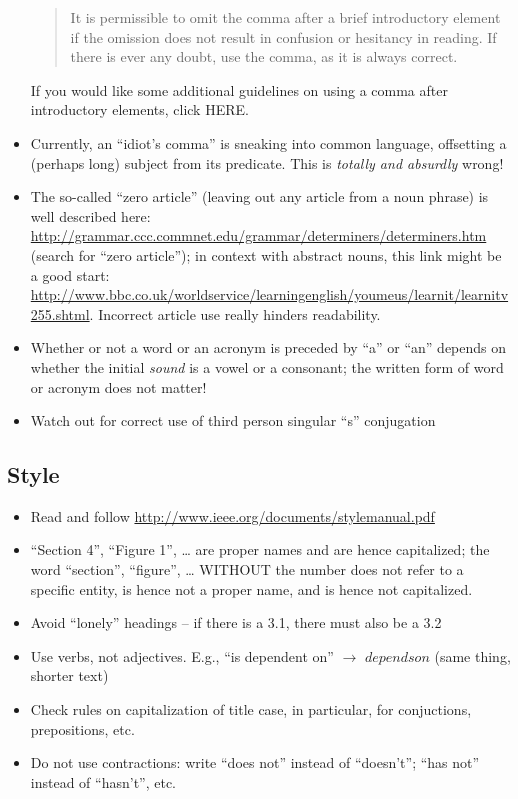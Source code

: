 \begin{itemize}
\begin{quote}
    It is permissible to omit the comma after a brief introductory
    element if the omission does not result in confusion or hesitancy
    in reading. If there is ever any doubt, use the comma, as it is
    always correct. 
  \end{quote}
 If you would like some additional guidelines on 
    using a comma after introductory elements, click HERE.
\item Currently, an ``idiot's comma'' is sneaking into common language, offsetting a (perhaps long) subject from its predicate. This is \emph{totally and absurdly} wrong! 
\item The so-called ``zero article'' (leaving out any article from a noun
phrase) is well described here:
\url{http://grammar.ccc.commnet.edu/grammar/determiners/determiners.htm}
(search for ``zero article''); in context with abstract nouns, this
link might be a good start:
\url{http://www.bbc.co.uk/worldservice/learningenglish/youmeus/learnit/learnitv255.shtml}. Incorrect article use really hinders readability. 
\item Whether or not a word or an acronym is preceded by ``a'' or ``an'' depends on whether the initial \emph{sound} is a vowel or a consonant; the written form of word or acronym does not matter!

\item Watch out for correct use of third person singular ``s'' conjugation
\end{itemize}

\subsection{Style}
\label{sec:orgheadline2}
\begin{itemize}
\item Read and follow  \url{http://www.ieee.org/documents/stylemanual.pdf}
\item ``Section 4'', ``Figure 1'', \ldots{} are proper names and are hence capitalized; the word ``section'', ``figure'', \ldots{} WITHOUT the number does not refer to a specific entity, is hence not a proper name, and is hence not capitalized.
\item Avoid ``lonely'' headings -- if there is a 3.1, there must also be a 3.2
\item Use verbs, not adjectives. E.g., ``is dependent on'' $\rightarrow$ $depends on$ (same thing, shorter text)
\item Check rules on capitalization of title case, in particular, for conjuctions, prepositions, etc.
\item Do not use contractions: write ``does not'' instead of ``doesn't''; ``has not'' instead of ``hasn't'', etc.
\end{itemize}

